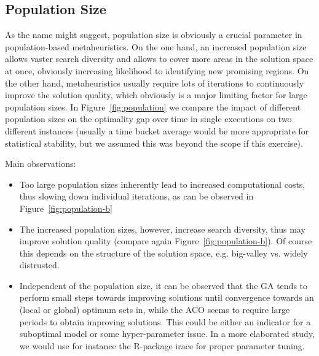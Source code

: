 \documentclass[12pt]{article}
\begin{document}
\subsection{Population Size}
As the name might suggest, population size is obviously a crucial parameter in population-based metaheuristics. On the one hand, an increased population size allows vaster search diversity and allows to cover more areas in the solution space at once, obviously increasing likelihood to identifying new promising regions. 
On the other hand, metaheuristics usually require lots of iterations to continuously improve the solution quality, which obviously is a major limiting factor for large population sizes. 
In Figure~\ref{fig:population} we compare the impact of different population sizes on the optimality gap over time in single executions on two different instances (usually a time bucket average would be more appropriate for statistical stability, but we assumed this was beyond the scope if this exercise).

Main observations:
\begin{itemize}
	\item Too large population sizes inherently lead to increased computational costs, thus slowing down individual iterations, as can be observed in Figure~\ref{fig:population-b}
	\item The increased population sizes, however, increase search diversity, thus may improve solution quality (compare again Figure~\ref{fig:population-b}). Of course this depends on the structure of the solution space, e.g. big-valley vs. widely distrusted.
	\item Independent of the population size, it can be observed that the GA tends to perform small steps towards improving solutions until convergence towards an (local or global) optimum sets in, while the ACO seems to require large periods to obtain improving solutions. This could be either an indicator for a suboptimal model or some hyper-parameter issue. In a more elaborated study, we would use for instance the R-package irace for proper parameter tuning. 
\end{itemize}
\end{document}
